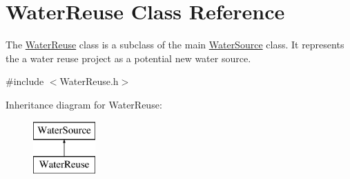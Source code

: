 \hypertarget{classWaterReuse}{}\section{Water\+Reuse Class Reference}
\label{classWaterReuse}


The {\ttfamily \mbox{\hyperlink{classWaterReuse}{Water\+Reuse}}} class is a subclass of the main {\ttfamily \mbox{\hyperlink{classWaterSource}{Water\+Source}}} class. It represents the a water reuse project as a potential new water source.  




{\ttfamily \#include $<$Water\+Reuse.\+h$>$}

Inheritance diagram for Water\+Reuse\+:\begin{figure}[H]
\begin{center}
\leavevmode
\includegraphics[height=2.000000cm]{classWaterReuse}
\end{center}
\end{figure}
